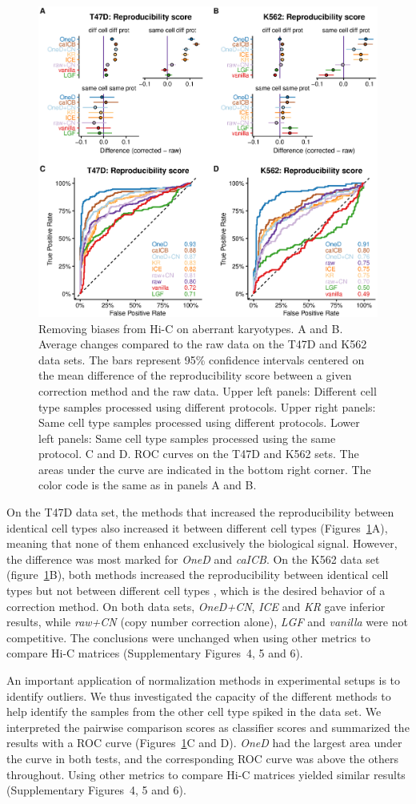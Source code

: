 \documentclass[a4,center,fleqn]{NAR}
\begin{document}
\begin{figure}
\centerline{\includegraphics[width=.49\textwidth]
  {nar_figures/figure_2.eps}}
\caption{Removing biases from Hi-C on aberrant karyotypes. A and B.
Average changes compared to the raw data on the T47D and K562 data sets.
The bars represent 95\% confidence intervals centered on the mean
difference of the reproducibility score between a given correction method
and the raw data. Upper left panels: Different cell type samples
processed using different protocols. Upper right panels: Same cell
type samples processed using different protocols. Lower left panels:
Same cell type samples processed using the same protocol. C and D. ROC
curves on the T47D and K562 sets. The areas under the curve are
indicated in the bottom right corner. The color code is the same as in
panels A and B.}
\label{fig:aberrant}
\end{figure}

On the T47D data set, the methods that increased the reproducibility
between identical cell types also increased it between different cell
types (Figures~\ref{fig:aberrant}A), meaning that none of them enhanced
exclusively the biological signal. However, the difference was most marked
for \textit{OneD} and \textit{caICB}. On the K562 data set
(figure~\ref{fig:aberrant}B), both methods increased the reproducibility
between identical cell types but not between different cell types
, which is the desired behavior of a
correction method. On both data sets, \textit{OneD+CN}, \textit{ICE} and
\textit{KR} gave inferior results, while \textit{raw+CN} (copy number
correction alone), \textit{LGF} and \textit{vanilla} were not competitive.
The conclusions were unchanged when using other metrics to compare Hi-C
matrices (Supplementary Figures~4, 5 and 6).

An important application of normalization methods in experimental setups
is to identify outliers. We thus investigated the capacity of the
different methods to help identify the samples from the other cell type
spiked in the data set. We interpreted the pairwise comparison scores as
classifier scores and summarized the results with a ROC curve
(Figures~\ref{fig:aberrant}C and D). \textit{OneD} had the largest area
under the curve in both tests, and the corresponding ROC curve was above
the others throughout. Using other metrics to compare Hi-C matrices
yielded similar results (Supplementary Figures~4, 5 and 6).
\end{document}
